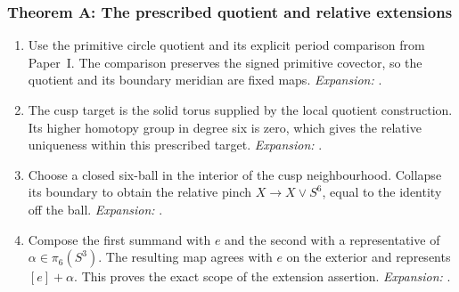 \subsubsection*{Theorem A: The prescribed quotient and relative extensions}
\begin{enumerate}[label=\arabic*.,leftmargin=*]
\item\hypertarget{step-III-A-1}{} Use the primitive circle quotient and its explicit period
comparison from Paper~I.  The comparison preserves the signed primitive
covector, so the quotient and its boundary meridian are fixed maps.
\textit{Expansion:} .
\item\hypertarget{step-III-A-2}{} The cusp target is the solid torus supplied by the local quotient
construction.  Its higher homotopy group in degree six is zero, which
gives the relative uniqueness within this prescribed target.
\textit{Expansion:} .
\item\hypertarget{step-III-A-3}{} Choose a closed six-ball in the interior of the cusp
neighbourhood.  Collapse its boundary to obtain the relative pinch
$X\to X\vee S^6$, equal to the identity off the ball.
\textit{Expansion:} .
\item\hypertarget{step-III-A-4}{} Compose the first summand with $e$ and the second with a
representative of $\alpha\in\pi_6(S^3)$.  The resulting map agrees
with $e$ on the exterior and represents $[e]+\alpha$.
This proves the exact scope of the extension assertion.
\textit{Expansion:} .
\end{enumerate}

\hypertarget{outline-III-B}{}
